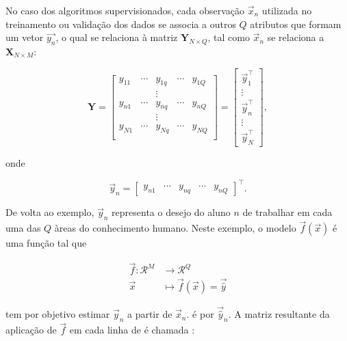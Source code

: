     No caso dos algoritmos supervisionados, cada observação $\vec{x}_n$ utilizada no treinamento ou validação dos dados se associa a outros $Q$ atributos
que formam um vetor $\vec{y_n}$, o qual se relaciona à matriz $\boldsymbol{Y}_{N \times Q}$, tal como $\vec{x}_n$ se relaciona a $\boldsymbol{X}_{N \times M}$:

    \begin{equation} \label{e:Y}
      \boldsymbol{Y} = \begin{bmatrix}
            y_{11} & \cdots & y_{1q} & \cdots & y_{1Q} \\
                   & & \vdots & &       \\
            y_{n1} & \cdots & y_{nq} & \cdots & y_{nQ} \\
                   & & \vdots & &       \\
            y_{N1} & \cdots & y_{Nq} & \cdots & y_{NQ} \\
          \end{bmatrix}
        = \begin{bmatrix}
            \vec{y}_1^{\top} \\
            \vdots \\
            \vec{y}_n^{\top} \\
            \vdots \\
            \vec{y}_N^{\top}
          \end{bmatrix}
          ,
    \end{equation}

    onde

    \begin{equation} \label{e:y_n}
      \vec{y}_n = \begin{bmatrix} y_{n1} & \cdots & y_{nq} & \cdots & y_{nQ} \end{bmatrix}^{\top}
      .
    \end{equation}

    De volta ao exemplo, $\vec{y}_n$ representa o desejo do aluno $n$ de trabalhar em cada uma das $Q$ àreas do conhecimento humano. Neste exemplo, o modelo $\vec{f}(\vec{x})$ é uma função tal que

    \begin{align*}
      \vec{f} \colon \mathcal{R}^M & \longrightarrow \mathcal{R}^Q \\
      \vec{x} & \longmapsto \vec{f}({\vec{x}}) = \vec{\hat{y}}
    \end{align*}

    \noindent tem por objetivo estimar $\vec{y}_n$ a partir de $\vec{x}_n$. \DIFdelbegin {}\DIFdelend \DIFaddbegin {}\DIFaddend é \DIFdelbegin {}\DIFdelend \DIFaddbegin {}\DIFaddend por $\vec{\hat{y}}_n$. A matriz resultante da aplicação de $\vec{f}$ em cada linha de \DIFdelbegin {}\DIFdelend \DIFaddbegin {}\DIFaddend é chamada \DIFdelbegin {}\DIFdelend \DIFaddbegin {}\DIFaddend :

